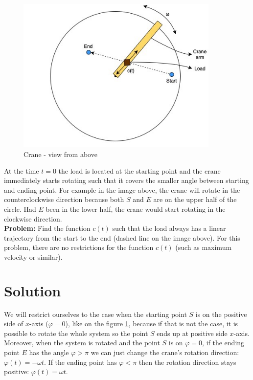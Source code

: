 \documentclass[11pt]{article}
\begin{document}
\begin{figure}[H]
\centering
\includegraphics[width=10cm]{img/crane.jpg}
\caption{Crane - view from above}
\label{fig:crane}
\end{figure}

At the time $t=0$ the load is located at the starting point and the crane immediately starts rotating such that it covers the smaller angle between starting and ending point. For example in the image above, the crane will rotate in the counterclockwise direction because both $S$ and $E$ are on the upper half of the circle. Had $E$ been in the lower half, the crane would start rotating in the clockwise direction. \\

\textbf{Problem:} Find the function $c(t)$ such that the load always has a linear trajectory from the start to the end (dashed line on the image above). For this problem, there are no restrictions for the function $c(t)$ (such as maximum velocity or similar).

\section{Solution}

We will restrict ourselves to the case when the starting point $S$ is on the positive side of $x$-axis ($\varphi = 0$), like on the figure \ref{fig:crane}, because if that is not the case, it is possible to rotate the whole system so the point $S$ ends up at positive side $x$-axis. Moreover, when the system is rotated and the point $S$ is on $\varphi = 0$, if the ending point $E$ has the angle $\varphi > \pi$ we can just change the crane's rotation direction: $\varphi(t) = -\omega t$. If the ending point has $\varphi < \pi$ then the rotation direction stays positive: $\varphi(t) = \omega t$.\\
\end{document}
